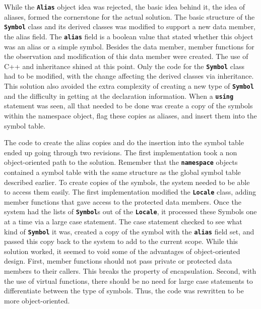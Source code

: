 \documentclass[12pt]{article} %
\newcommand{\reserved}[1]{\textbf{\texttt{#1}}} %
\begin{document}
While the \reserved{Alias} object idea was rejected, the basic idea
behind it, the idea of aliases, formed the cornerstone for the actual
solution. The basic structure of the \reserved{Symbol} class and its
derived classes was modified to support a new data member, the alias
field. The \reserved{alias} field is a boolean value that stated whether this
object was an alias or a simple symbol. Besides the data member,
member functions for the observation and modification of this data
member were created. The use of C++ and inheritance shined at this
point. Only the code for the \reserved{Symbol} class had to be
modified, with the change affecting the derived classes via
inheritance. This solution also avoided the extra complexity of creating a
new type of \reserved{Symbol} and the difficulty in getting at the declaration
information. When a \reserved{using} statement was seen, all that needed to be
done was create a copy of the symbols within the namespace
object, flag these copies as aliases, and insert them into the symbol
table.

The code to create the alias copies and do the insertion into the
symbol table ended up going through two revisions. The first
implementation took a non object-oriented path to the
solution. Remember that the \reserved{namespace} objects contained a
symbol table with the same structure as the global symbol table
described earlier. To create copies of the symbols, the system needed
to be able to access them easily. The first implementation modified
the
\reserved{Locale} class, adding member functions that gave access to
the protected data members. Once the system had the lists of
\reserved{Symbol}s out of the \reserved{Locale}, it processed these
Symbols one at a time via a large case statement. The case statement
checked to see what kind of \reserved{Symbol} it was, created a copy
of the symbol with the \reserved{alias} field set, and passed this
copy back to the system to add to the current scope. While this
solution worked, it seemed to void some of the advantages of
object-oriented design. First, member functions should not pass
private or protected data members to their callers. This breaks the
property of encapsulation. Second, with the use of virtual functions,
there should be no need for large case statements to differentiate
between the type of symbols. Thus, the code was rewritten to be more
object-oriented.
\end{document}
